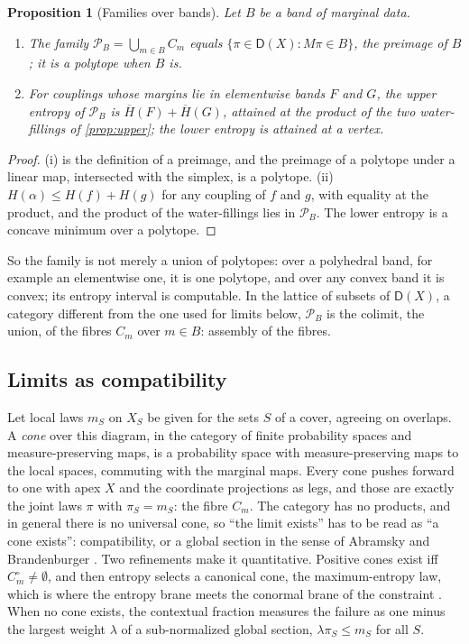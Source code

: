\documentclass[11pt]{article}
\newtheorem{proposition}[theorem]{Proposition}
\theoremstyle{definition}
\theoremstyle{remark}
\newcommand{\D}{\mathsf{D}}
\newcommand{\Hup}{\overline{H}}
\begin{document}
\begin{proposition}[Families over bands]\label{prop:family}
Let $B$ be a band of marginal data.
\begin{enumerate}[label=(\roman*)]
\item The family $\mathcal P_B=\bigcup_{m\in B}C_m$ equals $\{\pi\in\D(X):M\pi\in B\}$, the preimage of $B$; it is a polytope when $B$ is.
\item For couplings whose margins lie in elementwise bands $F$ and $G$, the upper entropy of $\mathcal P_B$ is $\Hup(F)+\Hup(G)$, attained at
  the product of the two water-fillings of \cref{prop:upper}; the lower entropy is attained at a vertex.
\end{enumerate}
\end{proposition}
\begin{proof}
(i) is the definition of a preimage, and the preimage of a polytope under a linear map, intersected with the simplex, is a polytope.
(ii) $H(\alpha)\le H(f)+H(g)$ for any coupling of $f$ and $g$, with equality at the product, and the product of the water-fillings lies
in $\mathcal P_B$. The lower entropy is a concave minimum over a polytope.
\end{proof}

So the family is not merely a union of polytopes: over a polyhedral band, for example an elementwise one, it is one polytope, and
over any convex band it is convex; its entropy interval is computable. In the lattice of subsets of $\D(X)$, a category different from
the one used for limits below, $\mathcal P_B$ is the colimit, the union, of the fibres $C_m$ over $m\in B$: assembly of the fibres.

\subsection{Limits as compatibility}

Let local laws $m_S$ on $X_S$ be given for the sets $S$ of a cover, agreeing on overlaps. A \emph{cone} over this diagram, in the
category of finite probability spaces and measure-preserving maps, is a probability space with measure-preserving maps to the local spaces, commuting with the marginal maps. Every cone pushes
forward to one with apex $X$ and the coordinate projections as legs, and those are exactly the joint laws $\pi$ with $\pi_S=m_S$: the
fibre $C_m$. The category has no products, and in general there is no universal cone, so ``the limit exists'' has
to be read as ``a cone exists'': compatibility, or a global section in the sense of Abramsky and Brandenburger
\cite{AbramskyBrandenburger2011}. Two refinements make it quantitative. Positive cones exist iff $C_m^\circ\ne\emptyset$, and then entropy
selects a canonical cone, the maximum-entropy law, which is where the entropy brane meets the conormal brane of the constraint
\cite[Thm.~3.1]{Bridges}. When no cone exists, the contextual fraction \cite{AbramskyBarbosaMansfield2017} measures the failure as one
minus the largest weight $\lambda$ of a sub-normalized global section, $\lambda\pi_S\le m_S$ for all $S$.
\end{document}
